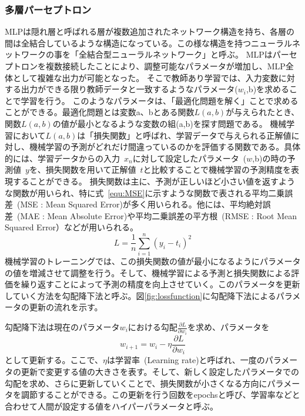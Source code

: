 \subsubsection{多層パーセプトロン}
MLPは隠れ層と呼ばれる層が複数追加されたネットワーク構造を持ち、各層の間は全結合しているような構造になっている。この様な構造を持つニューラルネットワークの事を「全結合型ニューラルネットワーク」と呼ぶ。
MLPはパーセプトロンを複数接続したことにより、調整可能なパラメータが増加し、MLP全体として複雑な出力が可能となった。
そこで教師あり学習では、入力変数に対する出力ができる限り教師データと一致するようなパラメータ($w_i$,b)を求めることで学習を行う。
このようなパラメータは、「最適化問題を解く」ことで求めることができる。最適化問題とは変数a、bとある関数$L(a,b)$が与えられたとき、関数$L(a,b)$の値が最小となるような変数の組(a,b)を探す問題である。
機械学習において$L(a,b)$は「損失関数」と呼ばれ、学習データで与えられる正解値に対し、機械学習の予測がどれだけ間違っているのかを評価する関数である。具体的には、学習データからの入力~$x_n$に対して設定したパラメータ~($w$,b)の時の予測値~$y$を、損失関数を用いて正解値~$t$と比較することで機械学習の予測精度を表現することができる。
損失関数は主に、予測が正しいほど小さい値を返すような関数が用いられ、特に式~\eqref{equ:MSE}に示すような関数で表される平均二乗誤差~(MSE : Mean Squared Error)が多く用いられる。他には、平均絶対誤差~(MAE : Mean Absolute Error)や平均二乗誤差の平方根~(RMSE : Root Mean Squared Error）などが用いられる。
\begin{equation}
    L = \frac{1}{n}\sum^{n}_{i=1}(y_i-t_i)^2
    \label{equ:MSE}
\end{equation}
機械学習のトレーニングでは、この損失関数の値が最小になるようにパラメータの値を増減させて調整を行う。そして、機械学習による予測と損失関数による評価を繰り返すことによって予測の精度を向上させていく。このパラメータを更新していく方法を勾配降下法と呼ぶ。図\ref{fig:lossfunction}に勾配降下法によるパラメータの更新の流れを示す。

勾配降下法は現在のパラメータ$w_i$における勾配$\frac{\partial L}{\partial w_i}$を求め、パラメータを
\begin{equation}
    w_{i+1} = w_i - \eta\frac{\partial L}{\partial w_i}
    \label{equ:勾配}
\end{equation}
として更新する。ここで、$\eta$は学習率~(Learning rate)と呼ばれ、一度のパラメータの更新で変更する値の大きさを表す。そして、新しく設定したパラメータでの勾配を求め、さらに更新していくことで、損失関数が小さくなる方向にパラメータを調節することができる。この更新を行う回数をepochsと呼び、学習率などと合わせて人間が設定する値をハイパーパラメータと呼ぶ。


